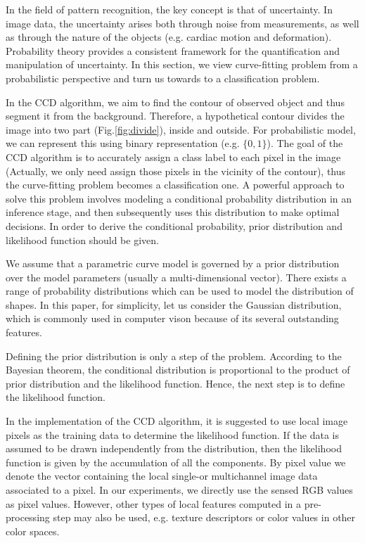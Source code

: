 \documentclass[conference]{IEEEtran}
\begin{document}
In the field of pattern recognition, the key concept is that of
uncertainty. In image data, the uncertainty arises both
through noise from measurements, as well as through the nature of
the objects (e.g. cardiac motion and deformation). Probability theory
provides a consistent framework for the quantification and
manipulation of uncertainty.  In this section, we view curve-fitting
problem from a probabilistic perspective and turn us towards to
a classification problem.

In the CCD algorithm, we aim to find the contour of observed object
and thus segment it from the background. Therefore, a hypothetical 
contour divides the image into two part (Fig.\ref{fig:divide}), inside
and outside. For probabilistic model, we can represent this using
binary representation (e.g. $\{0, 1\}$). The goal of the CCD algorithm
is to accurately
assign a class label to each pixel in the image (Actually, we only need assign those pixels in the vicinity of the
contour), thus the curve-fitting problem becomes a classification
one. A powerful approach to solve this problem involves modeling a
conditional probability distribution in an inference stage, and then
subsequently uses this distribution to make optimal decisions. In
order to derive the conditional probability, prior distribution and
likelihood function should be given.

We assume that a parametric curve model is governed by a prior distribution
over the model parameters (usually a multi-dimensional vector). There
exists a range of probability distributions which can be used to model
the distribution of shapes. In this paper, for simplicity, let us
consider the Gaussian distribution, which is commonly used in computer
vison because of its several outstanding features. 

Defining the prior distribution is only a step of the problem.
According to the Bayesian theorem, the conditional distribution
is proportional to the product of prior distribution and the likelihood
function. Hence, the next step is to define the likelihood function.

In the implementation of the CCD algorithm, it is suggested to use
local image pixels as the training data to determine the
likelihood function. If the data is assumed to be drawn  independently
from the distribution, then the likelihood function is given by the accumulation of all the components.
By pixel value we denote the vector containing the local single-or multichannel
image data associated to a pixel. In our experiments, we directly use the sensed RGB
values as pixel values. However, other types of local features computed in a pre-processing
step may also be used, e.g. texture descriptors or color values in
other color spaces.
\end{document}

